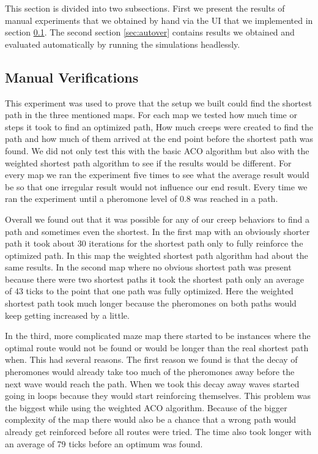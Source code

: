 This section is divided into two subsections. First we present the results of manual experiments that we obtained by hand via the UI that we implemented in section \ref{sec:manualver}.
The second section \ref{sec:autover} contains results we obtained and evaluated automatically by running the simulations headlessly.

\subsection{Manual Verifications}
\label{sec:manualver}
This experiment was used to prove that the setup we built could find the shortest path in the three mentioned maps. For each map we tested how much time or steps it took to find an optimized path, How much creeps were created to find the path and how much of them arrived at the end point before the shortest path was found. We did not only test this with the basic ACO algorithm but also with the weighted shortest path algorithm to see if the results would be different. For every map we ran the experiment five times to see what the average result would be so that one irregular result would not influence our end result. Every time we ran the experiment until a pheromone level of 0.8 was reached in a path. 

Overall we found out that it was possible for any of our creep behaviors  to find a path and sometimes even the shortest. In the first map with an obviously shorter path it took about 30 iterations for the shortest path only to fully reinforce the optimized path. In this map the weighted shortest path algorithm had about the same results. In the second map where no obvious shortest path was present because there were two shortest paths it took the shortest path only an average of 43 ticks to the point that one path was fully optimized. Here the weighted shortest path took much longer because the pheromones on both paths would keep getting increased by a little.  

In the third, more complicated maze map there started to be instances where the optimal route would not be found or would be longer than the real shortest path when. This had several reasons. The first reason we found is that the decay of pheromones would already take too much of the pheromones away before the next wave would reach the path. When we took this decay away waves started going in loops because they would start reinforcing themselves. This problem was the biggest while using the weighted ACO algorithm. Because of the bigger complexity of the map there would also be a chance that a wrong path would already get reinforced before all routes were tried. The time also took longer with an average of 79 ticks before an optimum was found. 

